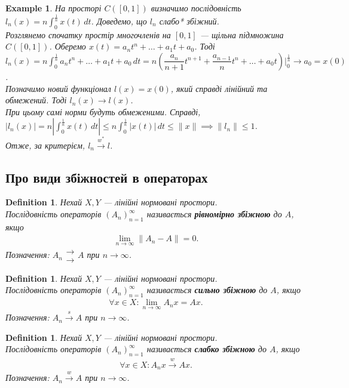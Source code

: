 \documentclass[a4paper, 10pt]{article}
\theoremstyle{theoremdd}
\theoremstyle{theoremdd}
\newtheorem{definition}[theorem]{Definition}
\theoremstyle{theoremdd}
\theoremstyle{theoremdd}
\newtheorem{example}[theorem]{Example}
\theoremstyle{theoremdd}
\theoremstyle{theoremdd}
\theoremstyle{theoremdd}
\theoremstyle{theoremdd}
\newcommand{\toweak}{\overset{w}{\to}}
\newcommand{\tostrong}{\overset{s}{\to}}
\newcommand{\toweakstar}{\overset{w^*}{\to}}
\begin{document}
\begin{example}
На просторі $C([0,1])$ визначимо послідовність $l_n(x) = n \displaystyle\int_0^{\frac{1}{n}} x(t)\,dt$. Доведемо, що $l_n$ слабо* збіжний.\\
Розглянемо спочатку простір многочленів на $[0,1]$ --- щільна підмножина $C([0,1])$. Оберемо $x(t) = a_n t^n + \dots + a_1 t + a_0$. Тоді\\
$l_n(x) = n\displaystyle\int_0^{\frac{1}{n}} a_n t^n + \dots + a_1 t + a_0\,dt = n \left( \dfrac{a_n}{n+1}t^{n+1} + \dfrac{a_{n-1}}{n}t^n + \dots + a_0 t \right)\Big|_{0}^{\frac{1}{n}} \to a_0 = x(0)$.\\
Позначимо новий функціонал $l(x) = x(0)$, який справді лінійний та обмежений. Тоді $l_n(x) \to l(x)$.\\
При цьому самі норми будуть обмеженими. Справді,\\
$|l_n(x)| = n \displaystyle\left|\int_0^{\frac{1}{n}} x(t)\,dt\right| \leq n \int_0^{\frac{1}{n}} |x(t)|\,dt \leq \|x\| \implies \|l_n\| \leq 1$.\\
Отже, за критерієм, $l_n \toweakstar l$.
\end{example}

\subsection{Про види збіжностей в операторах}
\begin{definition}
Нехай $X,Y$ --- лінійні нормовані простори.\\
Послідовність операторів $(A_n)_{n=1}^\infty$ називається \textbf{рівномірно збіжною} до $A$, якщо
\begin{align*}
\lim_{n \to \infty}\|A_n - A\| = 0.
\end{align*}
Позначення: $A_n \substack{\to \\ \to} A$ при $n \to \infty$.
\end{definition}

\begin{definition}
Нехай $X,Y$ --- лінійні нормовані простори.\\
Послідовність операторів $(A_n)_{n=1}^\infty$ називається \textbf{сильно збіжною} до $A$, якщо
\begin{align*}
\forall x \in X: \lim_{n \to \infty} A_n x = A x.
\end{align*}
Позначення: $A_n \tostrong A$ при $n \to \infty$.
\end{definition}

\begin{definition}
Нехай $X,Y$ --- лінійні нормовані простори.\\
Послідовність операторів $(A_n)_{n=1}^\infty$ називається \textbf{слабко збіжною} до $A$, якщо
\begin{align*}
\forall x \in X: A_n x \toweak A x.
\end{align*}
Позначення: $A_n \toweak A$ при $n \to \infty$.
\end{definition}
\end{document}
